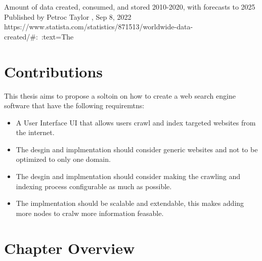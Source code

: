 Amount of data created, consumed, and stored 2010-2020, with forecasts to 2025
Published by 
Petroc Taylor
, Sep 8, 2022
https://www.statista.com/statistics/871513/worldwide-data-created/#:~:text=The%
\section{Contributions}

This thesis aims to propose a soltoin on how to create a web search engine software that have the following requiremtns: 
\begin{itemize}
  \item A User Interface UI that allows users crawl and index targeted websites from the internet.
\item The desgin and implmentation should consider generic websites and not to be optimized to only one domain.
    \item The desgin and implmentation should consider making the crawling and indexing process configurable as much as possible.
    \item The implmentation should be scalable and extendable, this makes adding more nodes to cralw more information feasable.
\end{itemize}
\section{Chapter Overview}
